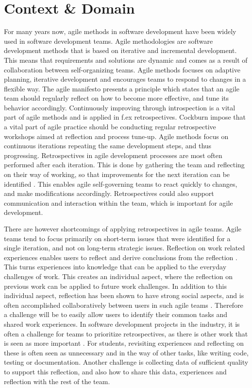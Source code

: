 \section{Context \& Domain}
For many years now, agile methods in software development have been widely used in software development teams. Agile methodologies are software development methods that is based on iterative and incremental development. This means that requirements and solutions are dynamic and comes as a result of collaboration between self-organizing teams. Agile methods focuses on adaptive planning, iterative development and encourages teams to respond to changes in a flexible way. The agile manifesto presents a principle which states that an agile team should regularly reflect on how to become more effective, and tune its behavior accordingly\citep{Beck2001}. Continuously improving through introspection is a vital part of agile methods and is applied in f.ex retrospectives\citep{Beck1999, Derby2006, Maham2008}. Cockburn impose that a vital part of agile practice should be conducting regular retrospective workshops aimed at reflection and process tune-up\citep{Cockburn2006}. Agile methods focus on continuous iterations repeating the same development steps, and thus progressing. Retrospectives in agile development processes are most often performed after each iteration. This is done by gathering the team and reflecting on their way of working, so that improvements for the next iteration can be identified \citep{Derby2006, Drury2011}. This enables agile self-governing teams to react quickly to changes, and make modifications accordingly\citep{Drury2011}. Retrospectives could also support communication and interaction within the team, which is important for agile development. 
 
There are however shortcomings of applying retrospectives in agile teams. Agile teams tend to focus primarily on short-term issues that were identified for a single iteration, and not on long-term strategic issues\citep{Drury2011}. Reflection on work related experiences enables users to reflect and derive conclusions from the reflection \citep{Korthagen_Vasalos_2005}. This turns experiences into knowledge that can be applied to the everyday challenges of work. This creates an individual aspect, where the reflection on previous work can be applied to future work challenges. In addition to this individual aspect, reflection has been shown to have strong social aspects, and is often accomplished collaboratively between users in such agile teams \citep{Høyrup_2004}. Therefore a challenge will be to easily allow users to identify their common tasks and shared work experiences. In software development projects in the industry, it is often a challenge for teams to prioritize retrospectives, as there is other work that is seen as more important \citep{kasi2008post}. For students, revisiting experiences and reflecting on these is often seen as unnecessary and in the way of other tasks, like writing code, testing or documentation. Another challenge is collecting data of sufficient quality to support this reflection, and also how to share this data, experiences and reflection with the rest of the team.  

